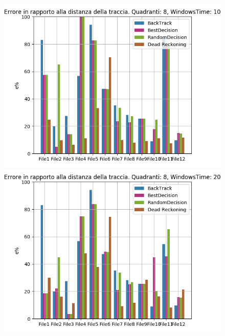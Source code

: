 \documentclass[12pt,a4paper,openright,twoside]{report}
\begin{document}
\begin{figure}[H]
\centering  
\includegraphics[scale=0.4]{firstChart8-10} 
\includegraphics[scale=0.4]{firstChart8-20} 
\end{figure}
\end{document}
